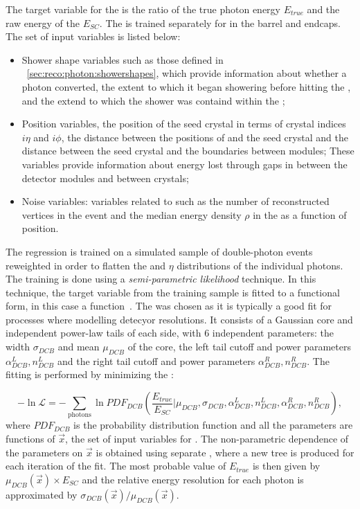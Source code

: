 The target variable for the \PhoEnergyBdt is the ratio of the true photon energy $E_{true}$ and the raw energy of the \SC $E_{SC}$. The \PhoEnergyBdt is trained separately for \SC\s in the barrel and endcaps. The set of input variables is listed below:
\begin{itemize}
\item Shower shape variables such as those defined in \Sec~\ref{sec:reco:photon:showershapes}, which provide information about whether a photon converted, the extent to which it began showering before hitting the \ECAL, and the extend to which the shower was containd within the \ECAL;
\item Position variables, the position of the seed crystal in terms of crystal indices $i\eta$ and $i\phi$, the distance between the positions of \SC and the seed crystal and the distance between the seed crystal and the boundaries between \ECAL modules; These variables provide information about energy lost through gaps in between the detector modules and between crystals; 
\item Noise variables: variables related to \PU such as the number of reconstructed vertices in the event and the median energy density $\rho$ in the \ECAL as a function of position.
\end{itemize}

The \PhoEnergyBdt regression is trained on a simulated sample of double-photon events reweighted in order to flatten the \pT and $\eta$ distributions of the individual photons. The training is done using a \emph{semi-parametric likelihood} technique. In this technique, the  target variable from the training sample is fitted to a functional form, in this case a \DCB function~\cite{CrystalBallFunction}. The \DCB was chosen as it is typically a good fit for processes where modelling detecyor resolutions. It consists of a Gaussian core and independent power-law tails of each side, with 6 independent parameters: the width $\sigma_{DCB}$ and mean $\mu_{DCB}$ of the core, the left tail cutoff and power parameters $\alpha_{DCB}^{L},n_{DCB}^{L}$ and the right tail cutoff and power parameters $\alpha_{DCB}^{R},n_{DCB}^{R}$. The fitting is performed by minimizing the \NLL:

\begin{equation}
\label{reco:eq:regression:dcb}
 - \ln \mathcal{L} = - \sum_{\textrm{photons}} \ln PDF_{DCB}( \frac{E_{true}}{E_{SC}} | \mu_{DCB}, \sigma_{DCB}, \alpha_{DCB}^{L},n_{DCB}^{L}, \alpha_{DCB}^{R},n_{DCB}^{R} ) , 
\end{equation}
 where $PDF_{DCB}$ is the \DCB probability distribution function and all the \DCB parameters are functions of $\vec{x}$, the set of input variables for \PhoEnergyBdt. The non-parametric dependence of the \DCB parameters on $\vec{x}$ is obtained using separate \BDT\s, where a new tree is produced for each iteration of the \NLL fit. The most probable value of $E_{true}$ is then given by $\mu_{DCB}(\vec{x}) \times E_{SC}$ and the relative energy resolution for each photon is approximated by $\sigma_{DCB}(\vec{x}) / \mu_{DCB}(\vec{x})$.

